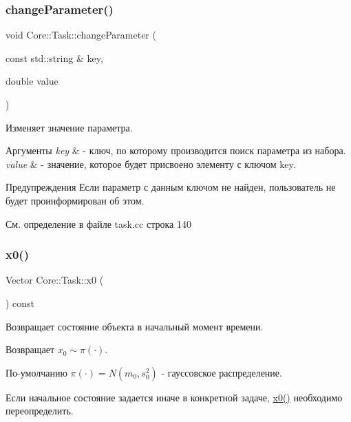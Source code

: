 \subsubsection{\texorpdfstring{change\+Parameter()}{changeParameter()}}
{\footnotesize\ttfamily void Core\+::\+Task\+::change\+Parameter (\begin{DoxyParamCaption}\item[{const std\+::string \&}]{key,  }\item[{double}]{value }\end{DoxyParamCaption})}



Изменяет значение параметра. 


\begin{DoxyParams}{Аргументы}
{\em key} & -\/ ключ, по которому производится поиск параметра из набора. \\
\hline
{\em value} & -\/ значение, которое будет присвоено элементу с ключом key.\\
\hline
\end{DoxyParams}
\begin{DoxyWarning}{Предупреждения}
Если параметр с данным ключом не найден, пользователь не будет проинформирован об этом. 
\end{DoxyWarning}


См. определение в файле task.\+cc строка 140

\hypertarget{class_core_1_1_task_aa550c0258f341215291fba1e8518c135}{}\label{class_core_1_1_task_aa550c0258f341215291fba1e8518c135} 
\subsubsection{\texorpdfstring{x0()}{x0()}}
{\footnotesize\ttfamily Vector Core\+::\+Task\+::x0 (\begin{DoxyParamCaption}{ }\end{DoxyParamCaption}) const\hspace{0.3cm}{\ttfamily [virtual]}}



Возвращает состояние объекта в начальный момент времени. 

\begin{DoxyReturn}{Возвращает}
$x_0 \sim \pi(\cdot)$.
\end{DoxyReturn}
По-\/умолчанию $\pi(\cdot) = N(m_0, s_0^2)$ -\/ гауссовское распределение.

Если начальное состояние задается иначе в конкретной задаче, \hyperlink{class_core_1_1_task_aa550c0258f341215291fba1e8518c135}{x0()} необходимо переопределить. 

